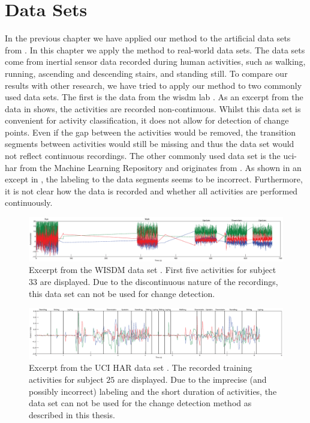 \section{Data Sets}\label{sec:data_sets}
In the previous chapter we have applied our method to the artificial data sets from \cite{camci2010change,takeuchi2006unifying}.
In this chapter we apply the method to real-world data sets.
The data sets come from inertial sensor data recorded during human activities, such as walking, running, ascending and descending stairs, and standing still.
To compare our results with other research, we have tried to apply our method to two commonly used data sets.
The first is the data from the \gls{wisdm} lab \cite{kwapisz2011activity}.
As an excerpt from the data in  shows, the activities are recorded non-continuous.
Whilst this data set is convenient for activity classification, it does not allow for detection of change points.
Even if the gap between the activities would be removed, the transition segments between activities would still be missing and thus the data set would not reflect continuous recordings.
The other commonly used data set is the \gls{uci-har} from the Machine Learning Repository and originates from \cite{anguita2012human}.
As shown in an except in , the labeling to the data segments seems to be incorrect.
Furthermore, it is not clear how the data is recorded and whether all activities are performed continuously.

\begin{figure}
\centering
  \includegraphics[width=1\textwidth]{./Figures/Chapter6/data_collection/wisdm_excerpt.eps}
  \caption[WISDM Excerpt]{Excerpt from the WISDM data set \cite{kwapisz2011activity}. First five activities for subject $33$ are displayed. Due to the discontinuous nature of the recordings, this data set can not be used for change detection.}
  \label{fig:wisdm_excerpt}
\end{figure}

\begin{figure}
\centering
  \includegraphics[width=1\textwidth]{./Figures/Chapter6/data_collection/uci_annotated.eps}
  \caption[UCI HAR Excerpt]{Excerpt from the UCI HAR data set \cite{anguita2012human}. The recorded training activities for subject $25$ are displayed. Due to the imprecise (and possibly incorrect) labeling and the short duration of activities, the data set can not be used for the change detection method as described in this thesis.}
  \label{fig:uci_annotated}
\end{figure}

